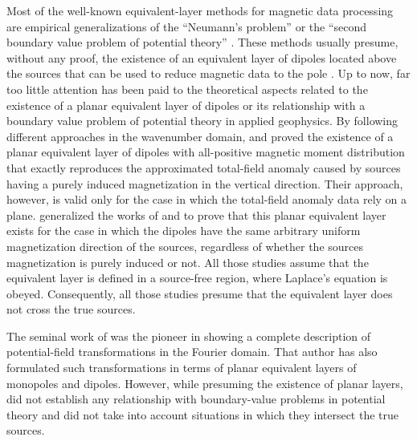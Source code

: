 Most of the well-known equivalent-layer methods for magnetic data processing are 
empirical generalizations of the ``Neumann's problem'' or the 
``second boundary value problem of potential theory'' \cite[][ p. 246]{kellogg1967}.
These methods usually presume, without any proof, the existence of an equivalent layer of 
dipoles located above the sources that can be used to reduce magnetic data to the pole 
\citep[e.g.,][]{emilia1973, bhattacharyya_chan1977, silva1986, leao-silva_1989, oliveirajr_etal2013, 
li_etal2014, oliveirajr_etal2015, ribeiro_filho_etal2020, reis_etal2020, li-etal2021, takahashi-etal2022, piauilino_etal2025}. 
Up to now, far too little attention has been paid to the theoretical aspects related to the 
existence of a planar equivalent layer of dipoles or its relationship with a boundary value
problem of potential theory in applied geophysics.
By following different approaches in the wavenumber domain, 
\cite{pedersen1991} and \cite{li_etal2014} proved the existence of a
planar equivalent layer of dipoles with all-positive
magnetic moment distribution that exactly reproduces the approximated total-field anomaly
\citep[e.g.,][p. 179]{blakely1996} caused by sources having a purely induced magnetization
in the vertical direction.
Their approach, however, is valid only for the case in which 
the total-field anomaly data rely on a plane.
\cite{reis_etal2020} generalized the works of \cite{pedersen1991} and \cite{li_etal2014}
to prove that this planar equivalent layer exists for the case in which the dipoles have 
the same arbitrary uniform magnetization direction of the sources, regardless of whether 
the sources magnetization is purely induced or not.
All those studies assume that the equivalent layer is defined in a source-free region, where  
Laplace’s equation is obeyed. Consequently, all those studies presume that the equivalent 
layer does not cross the true sources.

The seminal work of \cite{gunn1975} was the pioneer in showing a complete description of 
potential-field transformations in the Fourier domain. That author has also formulated such 
transformations in terms of planar equivalent layers of monopoles and dipoles.
However, while presuming the existence of planar layers, \cite{gunn1975} did not establish 
any relationship with boundary-value problems in potential theory and did not take into 
account situations in which they intersect the true sources.

